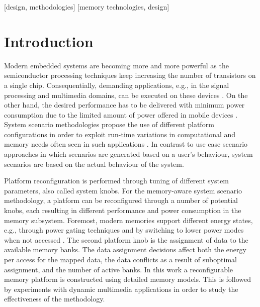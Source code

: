 \documentclass{acm_proc_article-sp}
\begin{document}
[design, methodologies]
[memory technologies, design]



\section{Introduction}
\label{sec:introduction}

Modern embedded systems are becoming more and more powerful as the semiconductor processing techniques keep increasing the number of transistors on a single chip. Consequentially, demanding applications, e.g., in the signal processing and multimedia domains, can be executed on these devices \cite{narasinga}. On the other hand, the desired performance has to be delivered with minimum power consumption due to the limited amount of power offered in mobile devices \cite{tcm}. System scenario methodologies propose the use of different platform configurations in order to exploit run-time variations in computational and memory needs often seen in such applications \cite{tcm}. In contrast to use case scenario approaches in which scenarios are generated based on a user's behaviour, system scenarios are based on the actual behaviour of the system.

Platform reconfiguration is performed through tuning of different system parameters, also called system knobs. For the memory-aware system scenario methodology, a platform can be reconfigured through a number of potential knobs, each resulting in different performance and power consumption in the memory subsystem. Foremost, modern memories support different energy states, e.g., through power gating techniques and by switching to lower power modes when not accessed \cite{Fil12}. The second platform knob is the assignment of data to the available memory banks. The data assignment decisions affect both the energy per access for the mapped data, the data conflicts as a result of suboptimal assignment, and the number of active banks. In this work a reconfigurable memory platform is constructed using detailed memory models. This is followed by experiments with dynamic multimedia applications in order to study the effectiveness of the methodology.
\end{document}
